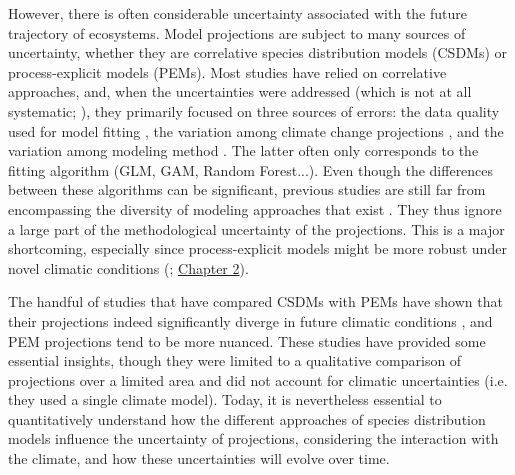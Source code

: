 \documentclass[letterpaper,8pt]{article}  %
\begin{document}
\begin{doublespacing}
\begin{linenumbers}
However, there is often considerable uncertainty associated with the future trajectory of ecosystems. Model projections are subject to many sources of uncertainty, whether they are correlative species distribution models (CSDMs) or process-explicit models (PEMs). Most studies have relied on correlative approaches, and, when the uncertainties were addressed (which is not at all systematic; \citealp{Simmonds2024}), they primarily focused on three sources of errors: the data quality used for model fitting \citep{Chen2013, BarbetMassin2010, Duputie2014, Faurby2018}, the variation among climate change projections \citep{Beaumont2007, DinizFilho2009, Thuiller2019}, and the variation among modeling method \citep{Pearson2006, DinizFilho2009, Thuiller2019}. The latter often only corresponds to the fitting algorithm (GLM, GAM, Random Forest...). Even though the differences between these algorithms can be significant, previous studies are still far from encompassing the diversity of modeling approaches that exist \citep{Dormann2012}. They thus ignore a large part of the methodological uncertainty of the projections. This is a major shortcoming, especially since process-explicit models might be more robust under novel climatic conditions (\citealp{VanderMeersch2024}; \hyperref[chapter2]{Chapter 2}).

The handful of studies that have compared CSDMs with PEMs have shown that their projections indeed significantly diverge in future climatic conditions \citep{Morin2009, Keenan2011a, Cheaib2012, Takolander2019}, and PEM projections tend to be more nuanced. These studies have provided some essential insights, though they were limited to a qualitative comparison of projections over a limited area and did not account for climatic uncertainties (i.e. they used a single climate model). Today, it is nevertheless essential to quantitatively understand how the different approaches of species distribution models influence the uncertainty of projections, considering the interaction with the climate, and how these uncertainties will evolve over time.


\end{linenumbers}
\end{doublespacing}
\end{document}
